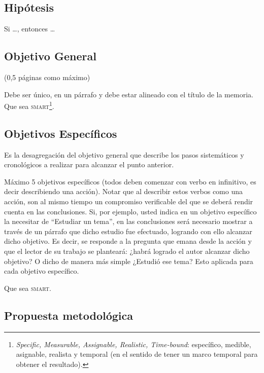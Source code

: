 \subsection{Hipótesis}

Si \ldots, entonces \ldots

\subsection{Objetivo General}

(0,5 páginas como máximo)

Debe ser único, en un párrafo y debe estar alineado con el título de la memoria. Que sea \textsc{smart}\footnote{\textit{\foreignlanguage{english}{Specific, Measurable, Assignable, Realistic, Time-bound}}: específico, medible, asignable, realista y temporal (en el sentido de tener un marco temporal para obtener el resultado).}.

\subsection{Objetivos Específicos}

Es la desagregación del objetivo general que describe los pasos sistemáticos y cronológicos a realizar para alcanzar el punto anterior.

Máximo 5 objetivos específicos (todos deben comenzar con verbo en infinitivo, es decir describiendo una acción). Notar que al describir estos verbos como una acción, son al mismo tiempo un compromiso verificable del que se deberá rendir cuenta en las conclusiones. Si, por ejemplo, usted indica en un objetivo específico la necesitar de ``Estudiar un tema'', en las conclusiones será necesario mostrar a través de un párrafo que dicho estudio fue efectuado, logrando con ello alcanzar dicho objetivo. Es decir, se responde a la pregunta que emana desde la acción y que el lector de su trabajo se planteará: ¿habrá logrado el autor alcanzar dicho objetivo? O dicho de manera más simple ¿Estudió ese tema? Esto aplicada para cada objetivo específico.

Que sea \textsc{smart}.

\subsection{Propuesta metodológica}

